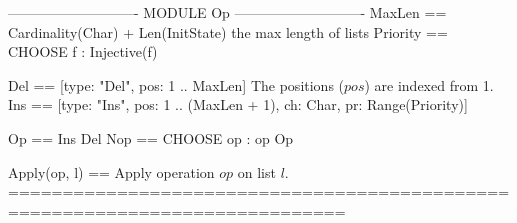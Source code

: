 \documentclass{article}
\begin{document}
\begin{tla}
---------------------------- MODULE Op ----------------------------
MaxLen == Cardinality(Char) + Len(InitState) \* the max length of lists
Priority == CHOOSE f  : Injective(f)

Del == [type: {"Del"}, pos: 1 .. MaxLen] \* The positions ($pos$) are indexed from 1.
Ins == [type: {"Ins"}, pos: 1 .. (MaxLen + 1), ch: Char, pr: Range(Priority)]

Op == Ins \cup Del        Nop == CHOOSE op : op \notin Op

Apply(op, l) == \* Apply operation $op$ on list $l$.
=============================================================================
\end{tla}
\end{document}
